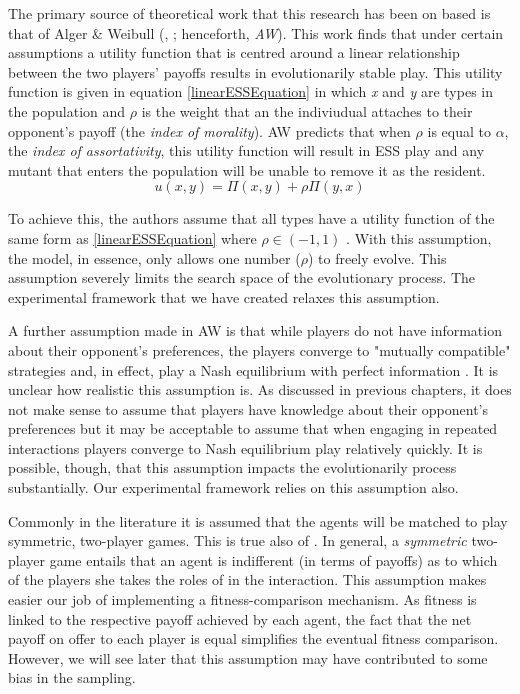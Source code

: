 \documentclass[11pt]{book}
\newcommand*{\np}{\par\noindent\newline}
\begin{document}
\np The primary source of theoretical work that this research has been on based is that of Alger \& Weibull (\citeyear{alger_generalization_2012}, \citeyear{alger_homo_2013}; henceforth, \textit{AW}).
This work finds that under certain assumptions a utility function that is centred around a linear relationship between the two players' payoffs results in evolutionarily stable play.
This utility function is given in equation \ref{linearESSEquation} in which \textit{x} and \textit{y} are types in the population and $\rho$ is the weight that an the indiviudual attaches to their opponent's payoff (the \textit{index of morality}).
AW predicts that when $\rho$ is equal to $\alpha$, the \textit{index of assortativity}, this utility function will result in ESS play and any mutant that enters the population will be unable to remove it as the resident.
\begin{equation}
	\label{linearESSEquation}
	u(x, y) = \Pi(x,y) + \rho\Pi(y,x)
\end{equation}

\noindent To achieve this, the authors assume that all types have a utility function of the same form as \ref{linearESSEquation} where $\rho \in (-1, 1)$ \citep[p. ~47]{alger_generalization_2012}.
With this assumption, the model, in essence, only allows one number ($\rho$) to freely evolve.
This assumption severely limits the search space of the evolutionary process. 
The experimental framework that we have created relaxes this assumption.

\np A further assumption made in AW is that while players do not have information about their opponent's preferences,
the players converge to "mutually compatible" strategies and, in effect, play a Nash equilibrium with perfect information \citep[p. ~46]{alger_generalization_2012}.
It is unclear how realistic this assumption is. 
As discussed in previous chapters, it does not make sense to assume that players have knowledge about their opponent's preferences 
but it may be acceptable to assume that when engaging in repeated interactions players converge to Nash equilibrium play relatively quickly.
It is possible, though, that this assumption impacts the evolutionarily process substantially. 
Our experimental framework relies on this assumption also.

\np Commonly in the literature it is assumed that the agents will be matched to play symmetric, two-player games.
This is true also of \citet{alger_generalization_2012}.
In general, a \textit{symmetric} two-player game entails that an agent is indifferent (in terms of payoffs) as to which of the players she takes the roles of in the interaction.
This assumption makes easier our job of implementing a fitness-comparison mechanism.
As fitness is linked to the respective payoff achieved by each agent, the fact that the net payoff on offer to each player is equal simplifies the eventual fitness comparison.
However, we will see later that this assumption may have contributed to some bias in the sampling.
\end{document}
